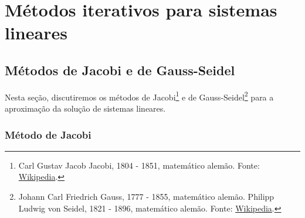 

\chapter{Métodos iterativos para sistemas lineares}\label{cap_sl_iter}
\thispagestyle{fancy}

\section{Métodos de Jacobi e de Gauss-Seidel}\label{cap_sl_iter_sec_jgs}

Nesta seção, discutiremos os métodos de Jacobi\footnote{Carl Gustav Jacob Jacobi, 1804 - 1851, matemático alemão. Fonte: \href{https://en.wikipedia.org/wiki/Carl_Gustav_Jacob_Jacobi}{Wikipedia}.} e de Gauss-Seidel\footnote{Johann Carl Friedrich Gauss, 1777 - 1855, matemático alemão. Philipp Ludwig von Seidel, 1821 - 1896, matemático alemão. Fonte: \href{https://en.wikipedia.org/wiki/Philipp_Ludwig_von_Seidel}{Wikipedia}.} para a aproximação da solução de sistemas lineares.

\subsection{Método de Jacobi}

